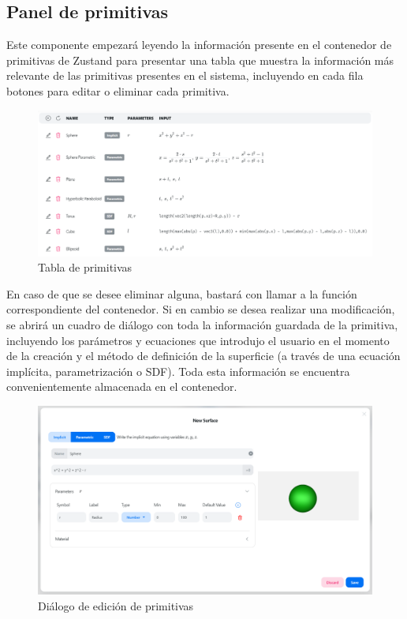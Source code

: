 \subsection{Panel de primitivas}\label{sec:primitivasPanel}
Este componente empezará leyendo la información presente en el contenedor de primitivas de Zustand para presentar una tabla que muestra la información más relevante de las primitivas presentes en el sistema, incluyendo en cada fila botones para editar o eliminar cada primitiva. 
\begin{figure}[ht!]
    \centering
    \includegraphics[width=\textwidth]{Plantilla-TFG-master/img/tablaParam.png}
    \caption{Tabla de primitivas}
\end{figure}
En caso de que se desee eliminar alguna, bastará con llamar a la función correspondiente del contenedor. Si en cambio se desea realizar una modificación, se abrirá un cuadro de diálogo con toda la información guardada de la primitiva, incluyendo los parámetros y ecuaciones que introdujo el usuario en el momento de la creación y el método de definición de la superficie (a través de una ecuación implícita, parametrización o SDF). Toda esta información se encuentra convenientemente almacenada en el contenedor.\newline
\begin{figure}[ht!]
    \centering
    \includegraphics[width=\textwidth]{Plantilla-TFG-master/img/panel.png}
    \caption{Diálogo de edición de primitivas}
\end{figure}

